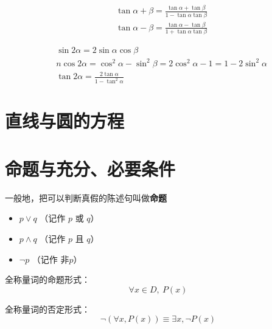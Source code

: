 \documentclass[a5paper]{article}
\begin{document}

\begin{align*}
    & \tan{\alpha + \beta} = \frac{\tan{\alpha} + \tan{\beta}}{1-\tan{\alpha}\tan{\beta}} \\
    & \tan{\alpha - \beta} = \frac{\tan{\alpha} - \tan{\beta}}{1+\tan{\alpha}\tan{\beta}}
\end{align*}


\begin{align*}
    & \sin{2 \alpha} = 2\sin{\alpha}\cos{\beta} \\
    & n\cos{2 \alpha} = \cos^2{\alpha} - \sin^2{\beta} = 2\cos^2{\alpha} - 1 = 1 - 2\sin^2{\alpha} \\
    & \tan{2 \alpha} = \frac{2 \tan{\alpha}}{1 - \tan^2{\alpha}}
\end{align*}

\section{{\large \textbf{直线与圆的方程}}}



\section{{\large \textbf{命题与充分、必要条件}}}


一般地，把可以判断真假的陈述句叫做\textbf{命题}


\begin{itemize}
    \item $p \vee q$ （记作 $p$ 或 $q$）
    \item $p \wedge q$ （记作 $p$ 且 $q$）
    \item $\neg{}p$ （记作 非$p$）
\end{itemize}


全称量词的命题形式：
\begin{equation*}
    \forall x \in D,~P(x)
\end{equation*}

全称量词的否定形式：
\begin{equation*}
    \neg(\forall x,P(x)) \equiv \exists{}x, \neg P(x)
\end{equation*}
\end{document}
